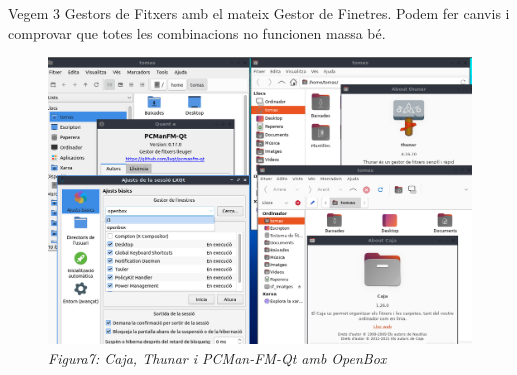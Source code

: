 \documentclass[
  a4paper,
]{article}
\begin{document}
Vegem 3 Gestors de Fitxers amb el mateix Gestor de Finetres. Podem fer
canvis i comprovar que totes les combinacions no funcionen massa bé.

\begin{figure}
\centering
\includegraphics{png/3ambOpenBox.png}
\caption{\emph{Figura7: Caja, Thunar i PCMan-FM-Qt amb OpenBox}}
\end{figure}
\end{document}
